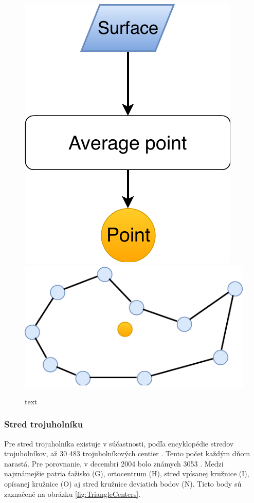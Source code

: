 \begin{figure}[H]
	\centering
	\includegraphics[height=0.3\textwidth]{obrazky-figures/Diagram/Point/DP Navrh operacii-0D - PointCenter of surface.pdf}
	\includegraphics[height=0.3\textwidth]{obrazky-figures/Diagram/Draw/1Points/DP Navrh operacii-0D - PointCenter of surface.pdf}
	\caption{text}
	\label{fig:1}
\end{figure}

\subsubsection{Stred trojuholníku}
Pre stred trojuholníka existuje v súčastnosti, podľa encyklopédie stredov trojuholníkov, až 30 483 trojuholníkových centier \cite{http://faculty.evansville.edu/ck6/encyclopedia/ETC.html}. Tento počet každým dňom narastá. Pre porovnanie, v decembri 2004 bolo známych 3053 \cite{http://mathworld.wolfram.com/KimberlingCenter.html}. Medzi najznámejšie patria ťažisko (G), ortocentrum (H), stred vpísanej kružnice (I), opísanej kružnice (O) aj stred kružnice deviatich bodov (N). Tieto body sú zaznačené na obrázku \ref{fig:TriangleCenters}.



